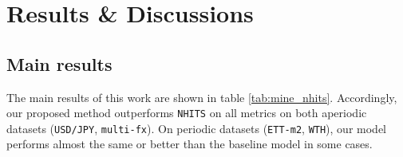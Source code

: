
\chapter{Results \& Discussions}
\label{chap:result}


\section{Main results}


The main results of this work are shown in table \ref{tab:mine_nhits}. Accordingly, our proposed method outperforms \verb|NHITS| on all metrics on both aperiodic datasets (\verb|USD/JPY|, \verb|multi-fx|). On periodic datasets (\verb|ETT-m2|, \verb|WTH|), our model performs almost the same or better than the baseline model in some cases.

